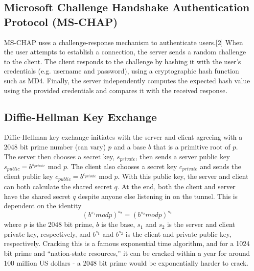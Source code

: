 \documentclass[runningheads]{llncs}
\begin{document}
\subsection{Microsoft Challenge Handshake Authentication Protocol (MS-CHAP)}
MS-CHAP uses a challenge-response mechanism to authenticate users.[2] When the user attempts to establish a connection, the server sends a random challenge to the client. The client responds to the challenge by hashing it with the user’s credentials (e.g. username and password), using a cryptographic hash function such as MD4. Finally, the server independently computes the expected hash value using the provided credentials and compares it with the received response.
\subsection{Diffie-Hellman Key Exchange}
Diffie-Hellman key exchange initiates with the server and client agreeing with a 2048 bit prime number (can vary) $p$ and a base $b$ that is a primitive root of $p$. The server then chooses a secret key, $s_{private}$, then sends a server public key $s_{public} = b^{s_{private}}$ mod $p$. The client also chooses a secret key $c_{private}$ and sends the client public key $c_{public} = b^{c_{private}}$ mod $p$. With this public key, the server and client can both calculate the shared secret $q$. At the end, both the client and server have the shared secret $q$ despite anyone else listening in on the tunnel. This is dependent on the identity
\begin{equation}
(b^{s_1} mod p)^{s_2} = (b^{s_2} mod p)^{s_1}
\end{equation}
where $p$ is the 2048 bit prime, $b$ is the base, $s_1$ and $s_2$ is the server and client private key,  respectively, and $b^{s_1}$ and $b^{s_2}$ is the client and private public key, respectively. Cracking this is a famous exponential time algorithm, and for a 1024 bit prime and “nation-state resources,” it can be cracked within a year for around 100 million US dollars - a 2048 bit prime would be exponentially harder to crack.
\end{document}
